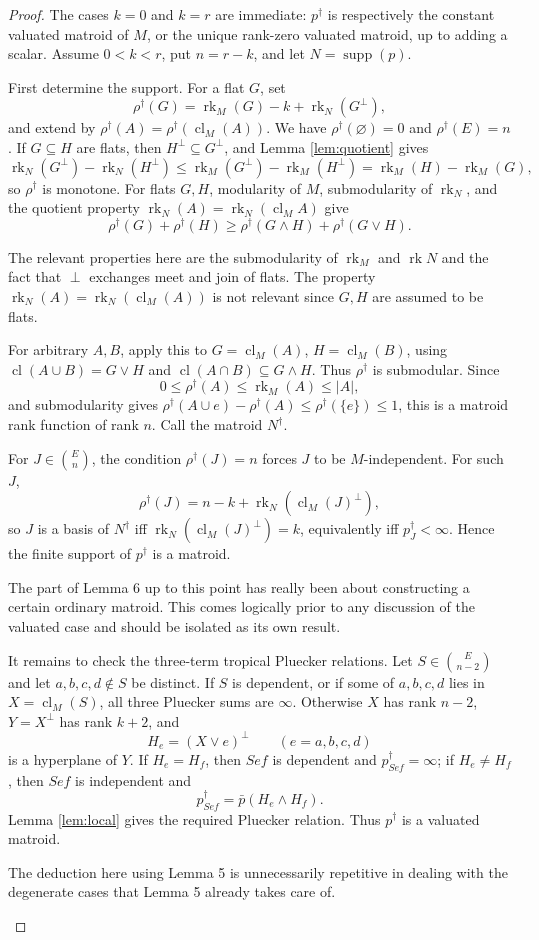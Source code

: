 \documentclass[12pt]{article}
\theoremstyle{definition}
\newcommand{\rk}{\operatorname{rk}}
\newcommand{\cl}{\operatorname{cl}}
\newcommand{\supp}{\operatorname{supp}}
\newcommand{\binomE}[1]{\binom{E}{#1}}
\newcommand{\review}[1]{\begin{reviewbox}#1\end{reviewbox}}
\begin{document}
\begin{proof}
The cases \(k=0\) and \(k=r\) are immediate: \(p^\dagger\) is respectively the constant valuated matroid of \(M\), or the unique rank-zero valuated matroid, up to adding a scalar.  Assume \(0<k<r\), put \(n=r-k\), and let \(N=\supp(p)\).

First determine the support.  For a flat \(G\), set
\[
\rho^\dagger(G)=\rk_M(G)-k+\rk_N(G^\perp),
\]
and extend by \(\rho^\dagger(A)=\rho^\dagger(\cl_M(A))\).  We have \(\rho^\dagger(\varnothing)=0\) and \(\rho^\dagger(E)=n\).  If \(G\subseteq H\) are flats, then \(H^\perp\subseteq G^\perp\), and Lemma \ref{lem:quotient} gives
\[
\rk_N(G^\perp)-\rk_N(H^\perp)\le \rk_M(G^\perp)-\rk_M(H^\perp)=\rk_M(H)-\rk_M(G),
\]
so \(\rho^\dagger\) is monotone.  For flats \(G,H\), modularity of \(M\), submodularity of \(\rk_N\), and the quotient property
\(\rk_N(A)=\rk_N(\cl_M A)\) give
\[
\rho^\dagger(G)+\rho^\dagger(H)\ge
\rho^\dagger(G\wedge H)+\rho^\dagger(G\vee H).
\]
\review{The relevant properties here are 
the submodularity of $\rk_M$ and $\rk N$ and the fact that $\perp$ exchanges meet and join of flats. The property $\rk_N(A) = \rk_N(\cl_M(A))$ is not relevant since $G, H$ are assumed to be flats.}
For arbitrary \(A,B\), apply this to \(G=\cl_M(A)\), \(H=\cl_M(B)\), using \(\cl(A\cup B)=G\vee H\) and \(\cl(A\cap B)\subseteq G\wedge H\).  Thus \(\rho^\dagger\) is submodular.  Since
\[
0\le \rho^\dagger(A)\le \rk_M(A)\le |A|,
\]
and submodularity gives \(\rho^\dagger(A\cup e)-\rho^\dagger(A)\le\rho^\dagger(\{e\})\le 1\), this is a matroid rank function of rank \(n\).  Call the matroid \(N^\dagger\).

For \(J\in\binomE n\), the condition \(\rho^\dagger(J)=n\) forces \(J\) to be \(M\)-independent.  For such \(J\),
\[
\rho^\dagger(J)=n-k+\rk_N(\cl_M(J)^\perp),
\]
so \(J\) is a basis of \(N^\dagger\) iff \(\rk_N(\cl_M(J)^\perp)=k\), equivalently iff \(p^\dagger_J<\infty\).  Hence the finite support of \(p^\dagger\) is a matroid.
\review{The part of Lemma 6 up to this point has really been about constructing a certain ordinary matroid. This comes logically prior to any discussion of the valuated case and should be isolated as its own result.}

It remains to check the three-term tropical Pluecker relations.  Let \(S\in\binomE{n-2}\) and let \(a,b,c,d\notin S\) be distinct.  If \(S\) is dependent, or if some of \(a,b,c,d\) lies in \(X=\cl_M(S)\), all three Pluecker sums are \(\infty\).  Otherwise \(X\) has rank \(n-2\), \(Y=X^\perp\) has rank \(k+2\), and
\[
H_e=(X\vee e)^\perp\qquad(e=a,b,c,d)
\]
is a hyperplane of \(Y\).  If \(H_e=H_f\), then \(Sef\) is dependent and \(p^\dagger_{Sef}=\infty\); if \(H_e\ne H_f\), then \(Sef\) is independent and
\[
p^\dagger_{Sef}=\bar p(H_e\wedge H_f).
\]
Lemma \ref{lem:local} gives the required Pluecker relation.  Thus \(p^\dagger\) is a valuated matroid.
\review{The deduction here using Lemma 5 is unnecessarily repetitive in dealing with the degenerate cases that Lemma 5 already takes care of.}


\end{proof}
\end{document}
